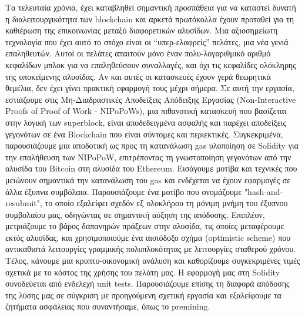 Τα τελευταία χρόνια, έχει καταβληθεί σημαντική προσπάθεια για να καταστεί
δυνατή η διαλειτουργικότητα των blockchain και αρκετά πρωτόκολλα έχουν προταθεί
για τη καθιέρωση της επικοινωνίας μεταξύ διαφορετικών αλυσίδων. Μια
αξιοσημείωτη τεχνολογία που έχει αυτό το στόχο είναι οι “υπερ-ελαφρείς”
πελάτες, μια νέα γενιά επαληθευτών. Αυτοί οι πελάτες απαιτούν μόνο έναν
πολυ-λογαριθμικό αριθμό κεφαλίδων μπλοκ για να επαληθεύσουν συναλλαγές, και όχι
τις κεφαλίδες ολόκληρης της υποκείμενης αλυσίδας. Αν και αυτές οι κατασκευές
έχουν γερά θεωρητικά θεμέλια, δεν έχει γίνει πρακτική εφαρμογή τους μέχρι
σήμερα. Σε αυτή την εργασία, εστιάζουμε στις Μη-Διαδραστικές Αποδείξεις
Απόδειξης Εργασίας (Non-Interactive Proofs of Proof of Work - NIPoPoWs), μια
πιθανοτική κατασκευή που βασίζεται στην λογική των superblock, είναι
αποδεδειγμένα ασφαλής και παρέχει αποδείξεις γεγονότων σε ένα Blockchain που
είναι σύντομες και περιεκτικές. Συγκεκριμένα, παρουσιάζουμε μια αποδοτική ως
προς τη κατανάλωση gas υλοποίηση σε Solidity για την επαλήθευση των NIPoPoW,
επιτρέποντας τη γνωστοποίηση γεγονότων από την αλυσίδα του Bitcoin στη αλυσίδα
του Ethereum. Εισάγουμε μοτίβα και τεχνικές που μειώνουν σημαντικά την
κατανάλωση του gas και ενδέχεται να έχουν εφαρμογές σε άλλα έξυπνα συμβόλαια.
Παρουσιάζουμε ένα μοτίβο που ονομάζουμε "hash-and-resubmit", το οποίο εξαλείφει
σχεδόν εξ ολοκλήρου τη μόνιμη μνήμη του έξυπνου συμβολαίου μας, οδηγώντας σε
σημαντική αύξηση της απόδοσης. Επιπλέον, μετριάζουμε το βάρος δαπανηρών πράξεων
στην αλυσίδα, τις οποίες μεταφέρουμε εκτός αλυσίδας, και χρησιμοποιούμε ένα
αισιόδοξο σχήμα (optimistic scheme) που αντικαθιστά λειτουργίες γραμμικής
πολυπλοκότητας με λειτουργίες σταθερού χρόνου. Τέλος, κάνουμε μια
κρυπτο-οικονομική ανάλυση και καθορίζουμε συγκεκριμένες τιμές σχετικά με το
κόστος της χρήσης του πελάτη μας. Η εφαρμογή μας στη Solidity συνοδεύεται από
ενδελεχή unit tests. Παρουσιάζουμε επίσης τη διαφορά απόδοσης της λύσης μας σε
σύγκριση με προηγούμενη σχετική εργασία και εξαλείφουμε τα ζητήματα ασφάλειας
που συναντήσαμε, όπως το premining.
